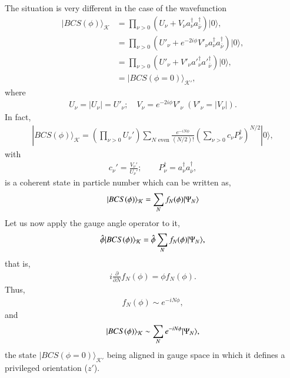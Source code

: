 The situation is very different in the case of the wavefunction
\begin{align}\label{eq3.7.7}
\nonumber|BCS(\phi)\rangle_{\mathcal{K}} &=\prod_{\nu>0}\left(U_\nu+V_\nu a_\nu^\dagger a_{\bar \nu}^{\dagger}\right)|0\rangle,\\
\nonumber&=\prod_{\nu>0}\left(U'_\nu+e^{-2i\phi}V'_\nu a^\dagger_\nu a^{\dagger}_{\bar \nu}\right)|0\rangle,\\
\nonumber&=\prod_{\nu>0}\left(U'_\nu+V'_\nu a'^\dagger_\nu a'^{\dagger}_{\bar \nu}\right)|0\rangle,\\
&=|BCS(\phi=0)\rangle_{\mathcal{K'}},
\end{align}
where 
\begin{align}
U_\nu=|U_\nu|=U'_\nu;\quad V_\nu=e^{-2i\phi}V'_\nu \;(V'_\nu=|V_\nu|).
\end{align}
In fact,
\begin{align}\label{eq3.7.19}
|BCS(\phi)\rangle_{\mathcal{K}}=\left(\prod_{\nu>0}U_\nu'\right)\sum_{N\text{ even}}\frac{e^{-iN\phi}}{(N/2)!}\left(\sum_{\nu>0}c_\nu P^\dagger_\nu\right)^{N/2}|0\rangle,
\end{align}
with
\begin{align}
c_\nu'=\frac{V_\nu'}{U_\nu'};\quad \quad P^\dagger_\nu=a^\dagger_\nu a^\dagger_{\bar\nu},
\end{align}
is a coherent state in particle number which can be written as,
\begin{align}\label{eq3.7.21}
|{BCS(\phi)} \rangle_{\mathcal K}=\sum_N f_N(\phi)|{\Psi_N} \rangle
\end{align}
Let us now apply the gauge angle operator to it,
\begin{align}
\hat{\phi}|{BCS(\phi)} \rangle_{\mathcal K}=\hat{\phi}\sum_{N}f_N(\phi)|{\Psi_N} \rangle,
\end{align}
that is,
\begin{align}
i\frac{\partial}{\partial N}f_N(\phi)=\phi f_N(\phi).
\end{align}
Thus,
\begin{align}
f_N(\phi)\sim e^{-iN\phi},
\end{align}
and
\begin{align}
|{BCS(\phi)} \rangle_{\mathcal K}\sim \sum_{N} e^{-iN\phi}|{\Psi_N} \rangle,
\end{align}
 the state $|BCS(\phi=0)\rangle_{\mathcal{K}'}$ being aligned in gauge space in which it defines a privileged orientation ($z'$).


